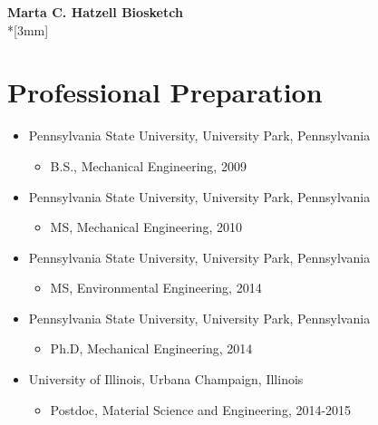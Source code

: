 
\renewcommand{\LeftFooter}{Biosketch}
\renewcommand{\LeftHeader}{Marta C. Hatzell}
\renewcommand{\PageLimit}{2}
\begin{center}
{\bf Marta C. Hatzell Biosketch} \\*[3mm]
\end{center}

\setcounter{section}{0}
\section{Professional Preparation}\label{MCH-professional-preparation}

\begin{itemize}
\itemsep1pt\parskip0pt
\item
  Pennsylvania State University, University Park, Pennsylvania

  \begin{itemize}
  \itemsep1pt\parskip0pt
  \item
    B.S., Mechanical Engineering, 2009
  \end{itemize}
\item
  Pennsylvania State University, University Park, Pennsylvania

  \begin{itemize}
  \itemsep1pt\parskip0pt
  \item
    MS, Mechanical Engineering, 2010
  \end{itemize}
  \item
  Pennsylvania State University, University Park, Pennsylvania

  \begin{itemize}
  \itemsep1pt\parskip0pt
  \item
    MS, Environmental Engineering, 2014
  \end{itemize}
\item
  Pennsylvania State University, University Park, Pennsylvania

  \begin{itemize}
  \itemsep1pt\parskip0pt
  \item
    Ph.D, Mechanical Engineering, 2014
  \end{itemize}
\item
  University of Illinois, Urbana Champaign, Illinois

  \begin{itemize}
  \itemsep1pt\parskip0pt
  \item
    Postdoc, Material Science and Engineering, 2014-2015
  \end{itemize}
\end{itemize}

